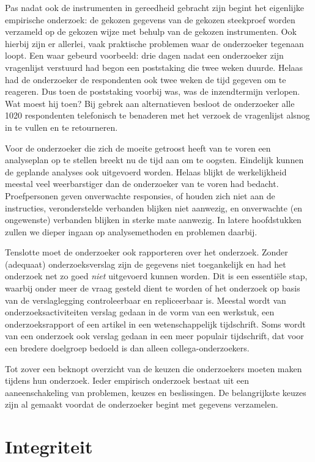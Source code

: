 \documentclass[
]{book}
\begin{document}
Pas nadat ook de instrumenten in gereedheid gebracht zijn begint het
eigenlijke empirische onderzoek: de gekozen gegevens van de gekozen
steekproef worden verzameld op de gekozen wijze met behulp van de
gekozen instrumenten. Ook hierbij zijn er allerlei, vaak praktische
problemen waar de onderzoeker tegenaan loopt. Een waar gebeurd
voorbeeld: drie dagen nadat een onderzoeker zijn vragenlijst verstuurd
had begon een poststaking die twee weken duurde. Helaas had de
onderzoeker de respondenten ook twee weken de tijd gegeven om te
reageren. Dus toen de poststaking voorbij was, was de inzendtermijn
verlopen. Wat moest hij toen? Bij gebrek aan alternatieven besloot de
onderzoeker alle 1020 respondenten telefonisch te benaderen met het
verzoek de vragenlijst alsnog in te vullen en te retourneren.

Voor de onderzoeker die zich de moeite getroost heeft van te voren een
analyseplan op te stellen breekt nu de tijd aan om te oogsten. Eindelijk
kunnen de geplande analyses ook uitgevoerd worden. Helaas blijkt de
werkelijkheid meestal veel weerbarstiger dan de onderzoeker van te voren
had bedacht. Proefpersonen geven onverwachte responsies, of houden zich
niet aan de instructies, veronderstelde verbanden blijken niet aanwezig,
en onverwachte (en ongewenste) verbanden blijken in sterke mate
aanwezig. In latere hoofdstukken zullen we dieper ingaan op
analysemethoden en problemen daarbij.

Tenslotte moet de onderzoeker ook rapporteren over het onderzoek. Zonder
(adequaat) onderzoeksverslag zijn de gegevens niet toegankelijk en had
het onderzoek net zo goed \emph{niet} uitgevoerd kunnen worden. Dit is een
essentiële stap, waarbij onder meer de vraag gesteld dient te worden of
het onderzoek op basis van de verslaglegging controleerbaar en
repliceerbaar is. Meestal wordt van onderzoeksactiviteiten verslag
gedaan in de vorm van een werkstuk, een onderzoeksrapport of een artikel in een wetenschappelijk tijdschrift. Soms wordt van een onderzoek ook
verslag gedaan in een meer populair tijdschrift, dat voor een bredere
doelgroep bedoeld is dan alleen collega-onderzoekers.

Tot zover een beknopt overzicht van de keuzen die onderzoekers moeten
maken tijdens hun onderzoek. Ieder empirisch onderzoek bestaat uit een
aaneenschakeling van problemen, keuzes en beslissingen. De belangrijkste
keuzes zijn al gemaakt voordat de onderzoeker begint met gegevens
verzamelen.

\chapter{Integriteit}\label{ch-integriteit}
\end{document}
